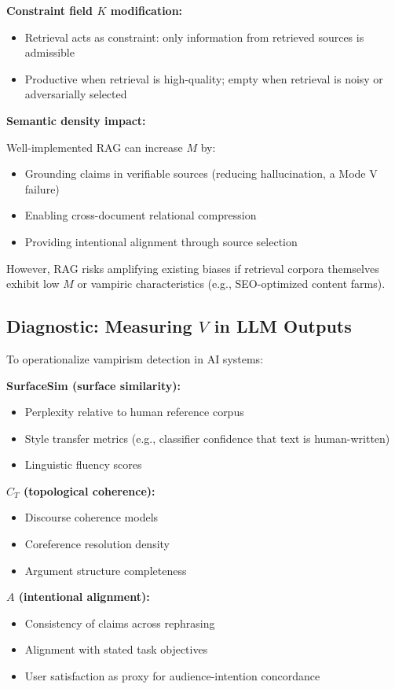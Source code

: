 \documentclass[12pt]{article}
\begin{document}
\textbf{Constraint field $K$ modification:}
\begin{itemize}
\item Retrieval acts as constraint: only information from retrieved sources is admissible
\item Productive when retrieval is high-quality; empty when retrieval is noisy or adversarially selected
\end{itemize}

\textbf{Semantic density impact:}

Well-implemented RAG can increase $M$ by:
\begin{itemize}
\item Grounding claims in verifiable sources (reducing hallucination, a Mode V failure)
\item Enabling cross-document relational compression
\item Providing intentional alignment through source selection
\end{itemize}

However, RAG risks amplifying existing biases if retrieval corpora themselves exhibit low $M$ or vampiric characteristics (e.g., SEO-optimized content farms).

\subsection{Diagnostic: Measuring $V$ in LLM Outputs}

To operationalize vampirism detection in AI systems:

\textbf{SurfaceSim (surface similarity):}
\begin{itemize}
\item Perplexity relative to human reference corpus
\item Style transfer metrics (e.g., classifier confidence that text is human-written)
\item Linguistic fluency scores
\end{itemize}

\textbf{$C_T$ (topological coherence):}
\begin{itemize}
\item Discourse coherence models \citep{li2014recursive}
\item Coreference resolution density
\item Argument structure completeness
\end{itemize}

\textbf{$A$ (intentional alignment):}
\begin{itemize}
\item Consistency of claims across rephrasing
\item Alignment with stated task objectives
\item User satisfaction as proxy for audience-intention concordance
\end{itemize}
\end{document}
